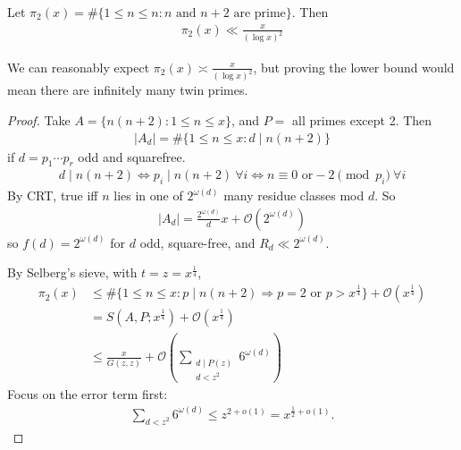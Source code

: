 \documentclass{article}
\newcommand{\1}{\mathbbm{1}}
\newcommand{\bigO}{\mathcal{O}}
\begin{document}
\begin{nthm}[Brun]\label{thm:2.5}
  Let $\pi_2(x) = \# \{1 \leq n \leq n : n \text{ and } n+2 \text{ are prime}\}$.
  Then
  \begin{align*}
    \pi_2(x) \ll \frac{x}{(\log x)^2}
  \end{align*}
\end{nthm}
We can reasonably expect $\pi_2(x) \asymp \frac{x}{(\log x)^2}$, but proving the lower bound would mean there are infinitely many twin primes.
\begin{proof}
  Take $A = \{n(n+2) : 1 \leq n \leq x\}$, and $P=$ all primes except 2.
  Then
  \begin{align*}
    |A_d| = \#\{1 \leq n \leq x : d \mid n(n+2)\}
  \end{align*}
  if $d = p_1 \dotsm p_r$ odd and squarefree.
  \begin{align*}
    d \mid n(n+2) \iff p_i \mid n(n+2) \ \forall i \iff n \equiv 0 \text{ or} -2 \pmod{p_i} \ \forall i
  \end{align*}
  By CRT, true iff $n$ lies in one of $2^{\omega(d)}$ many residue classes mod $d$. So
  \begin{align*}
    |A_d| = \frac{2^{\omega(d)}}{d} x + \bigO(2^{\omega(d)})
  \end{align*}
  so $f(d) = 2^{\omega(d)}$ for $d$ odd, square-free, and $R_d \ll 2^{\omega(d)}$.

  By Selberg's sieve, with $t = z = x^{\frac{1}{4}}$,
  \begin{align*}
    \pi_2(x) &\leq \# \{1 \leq n \leq x : p \mid n(n+2) \Rightarrow p = 2 \text{ or } p > x^{\frac 14}\} + \bigO(x^{\frac{1}4}) \\
             &= S(A,P; x^{\frac{1}{4}}) + \bigO(x^{\frac 14}) \\
             &\leq \frac{x}{G(z,z)} + \bigO(\sum_{\substack{d \mid P(z) \\ d < z^2}} 6^{\omega(d)})
  \end{align*}
  Focus on the error term first:
  \begin{align*}
    \sum_{d < z^2} 6^{\omega(d)} \leq z^{2 + o(1)} = x^{\frac{1}{2} + o(1)}.
  \end{align*}


\end{proof}
\end{document}
